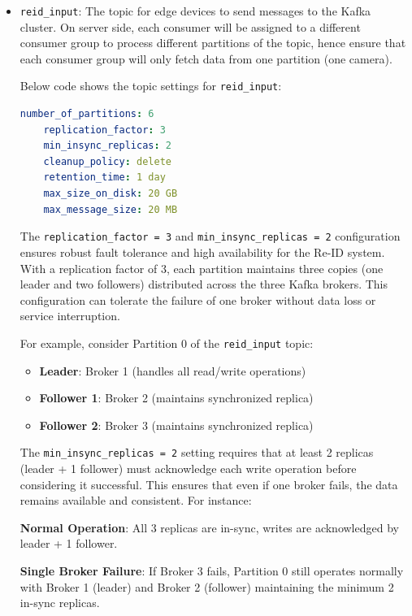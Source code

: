 \begin{itemize}
    \item \texttt{reid\_input}: The topic for edge devices to send messages to the Kafka cluster. On server side, each consumer will be assigned to a different consumer group to process different partitions of the topic, hence ensure that each consumer group will only fetch data from one  partition (one camera). 
    
    Below code shows the topic settings for \texttt{reid\_input}:
    
    \begin{lstlisting}[language=yaml]
    number_of_partitions: 6
    replication_factor: 3
    min_insync_replicas: 2
    cleanup_policy: delete
    retention_time: 1 day
    max_size_on_disk: 20 GB
    max_message_size: 20 MB
    \end{lstlisting}

    The \texttt{replication\_factor = 3} and \texttt{min\_insync\_replicas = 2} configuration ensures robust fault tolerance and high availability for the Re-ID system. With a replication factor of 3, each partition maintains three copies (one leader and two followers) distributed across the three Kafka brokers. This configuration can tolerate the failure of one broker without data loss or service interruption.
    
    For example, consider Partition 0 of the \texttt{reid\_input} topic:
    \begin{itemize}
        \item \textbf{Leader}: Broker 1 (handles all read/write operations)
        \item \textbf{Follower 1}: Broker 2 (maintains synchronized replica)
        \item \textbf{Follower 2}: Broker 3 (maintains synchronized replica)
    \end{itemize}
    
    The \texttt{min\_insync\_replicas = 2} setting requires that at least 2 replicas (leader + 1 follower) must acknowledge each write operation before considering it successful. This ensures that even if one broker fails, the data remains available and consistent. For instance:
    
    \textbf{Normal Operation}: All 3 replicas are in-sync, writes are acknowledged by leader + 1 follower.
    
    \textbf{Single Broker Failure}: If Broker 3 fails, Partition 0 still operates normally with Broker 1 (leader) and Broker 2 (follower) maintaining the minimum 2 in-sync replicas.
    

\end{itemize}
